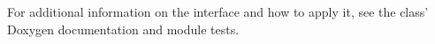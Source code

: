 \documentclass{InsightArticle}
\begin{document}
For additional information on the interface and how to apply it, see the
class' Doxygen documentation and module tests.

%
%



\end{document}

